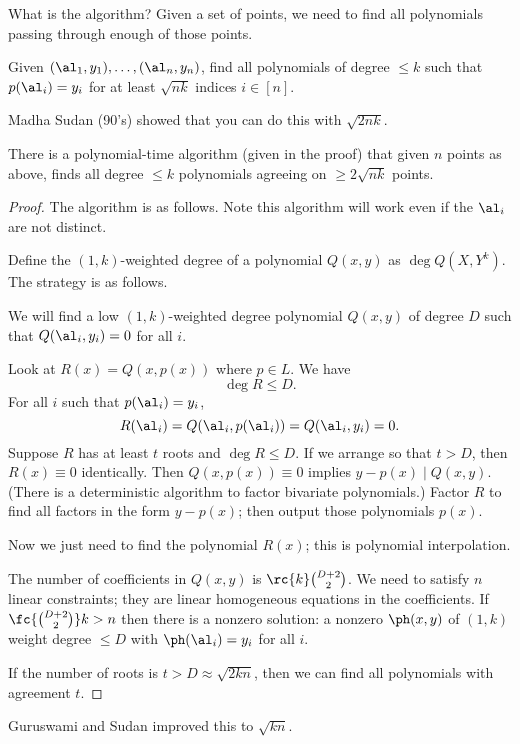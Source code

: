 What is the algorithm? Given a set of points, we need to find all polynomials passing through enough of those points.
\begin{prb}
Given $(\al_1,y_1),\ldots, (\al_n,y_n)$, find all polynomials of degree $\le k$ such that $p(\al_i)=y_i$ for at least $\sqrt{nk}$ indices $i\in[n]$. 
\end{prb}
Madha Sudan (90's) showed that you can do this with $\sqrt{2nk}$. 
\begin{thm}
There is a polynomial-time algorithm (given in the proof) that given $n$ points as above, finds all degree $\le k$ polynomials agreeing on $\ge 2\sqrt{nk}$ points. 
\end{thm}
\begin{proof}
The algorithm is as follows.
Note this algorithm will work even if the $\al_i$ are not distinct.

Define the $(1,k)$-weighted degree of a polynomial $Q(x,y)$ as $\deg Q(X,Y^k)$.
The strategy is as follows.

We will find a low $(1,k)$-weighted degree polynomial $Q(x,y)$ of degree $D$ such that $Q(\al_i,y_i)=0$ for all $i$.

Look at $R(x)=Q(x,p(x))$ where $p\in L$. We have
\[
\deg R\le D.
\]
For all $i$ such that $p(\al_i)=y_i$, 
\[
R(\al_i)=Q(\al_i,p(\al_i))=Q(\al_i,y_i)=0.
\]
Suppose $R$ has at least $t$ roots and $\deg R\le D$.  If we arrange so that $t>D$, then $R(x)\equiv 0$ identically. Then $Q(x,p(x))\equiv 0$ implies $y-p(x)\mid Q(x,y)$.
(There is a deterministic algorithm to factor bivariate polynomials.) Factor $R$ to find all factors in the form $y-p(x)$; then output those polynomials $p(x)$.

Now we just need to find the polynomial $R(x)$; this is polynomial interpolation. 

The number of coefficients in $Q(x,y)$ is $\rc{k}\binom{D+2}2$. We need to satisfy $n$ linear constraints; they are linear homogeneous equations in the coefficients. If $\fc{\binom{D+2}2}k>n$ then there is a nonzero solution: a nonzero $\ph(x,y)$ of $(1,k)$ weight degree $\le D$ with $\ph(\al_i)=y_i$ for all $i$.

If the number of roots is $t>D\approx \sqrt{2kn}$, then we can find all polynomials with agreement $t$.
\end{proof}
Guruswami and Sudan improved this to $\sqrt{kn}$.

